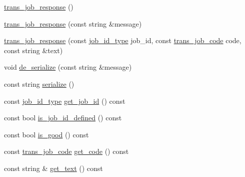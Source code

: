 \begin{DoxyCompactItemize}
\item 
\hyperlink{classuva_1_1smt_1_1bpbd_1_1common_1_1messaging_1_1trans__job__response_ae7a6931b79309d260023c64fd4b080da}{trans\+\_\+job\+\_\+response} ()
\item 
\hyperlink{classuva_1_1smt_1_1bpbd_1_1common_1_1messaging_1_1trans__job__response_af719aea73081b32e7a0c39a752292766}{trans\+\_\+job\+\_\+response} (const string \&message)
\item 
\hyperlink{classuva_1_1smt_1_1bpbd_1_1common_1_1messaging_1_1trans__job__response_ac2814ba7823aff2be1bfa3ca06be1c1c}{trans\+\_\+job\+\_\+response} (const \hyperlink{namespaceuva_1_1smt_1_1bpbd_1_1common_1_1messaging_af12d41e7490214ac057969e9d4af1436}{job\+\_\+id\+\_\+type} job\+\_\+id, const \hyperlink{classuva_1_1smt_1_1bpbd_1_1common_1_1messaging_1_1trans__job__code}{trans\+\_\+job\+\_\+code} code, const string \&text)
\item 
void \hyperlink{classuva_1_1smt_1_1bpbd_1_1common_1_1messaging_1_1trans__job__response_a622c08192b6fa4be571e21a5a2d07ae3}{de\+\_\+serialize} (const string \&message)
\item 
const string \hyperlink{classuva_1_1smt_1_1bpbd_1_1common_1_1messaging_1_1trans__job__response_af0bc18e3858e5b481c8c6eb6a5af9498}{serialize} ()
\item 
const \hyperlink{namespaceuva_1_1smt_1_1bpbd_1_1common_1_1messaging_af12d41e7490214ac057969e9d4af1436}{job\+\_\+id\+\_\+type} \hyperlink{classuva_1_1smt_1_1bpbd_1_1common_1_1messaging_1_1trans__job__response_a1c7615198ec21bf9eca3c881de1ef2bd}{get\+\_\+job\+\_\+id} () const 
\item 
const bool \hyperlink{classuva_1_1smt_1_1bpbd_1_1common_1_1messaging_1_1trans__job__response_ab2f1298855e8c9579d9688e81310cc39}{is\+\_\+job\+\_\+id\+\_\+defined} () const 
\item 
const bool \hyperlink{classuva_1_1smt_1_1bpbd_1_1common_1_1messaging_1_1trans__job__response_adb361ceab49050ec59f3505201f0c95f}{is\+\_\+good} () const 
\item 
const \hyperlink{classuva_1_1smt_1_1bpbd_1_1common_1_1messaging_1_1trans__job__code}{trans\+\_\+job\+\_\+code} \hyperlink{classuva_1_1smt_1_1bpbd_1_1common_1_1messaging_1_1trans__job__response_a1ab3c9cef7e2ec3f9ff004f5e4078297}{get\+\_\+code} () const 
\item 
const string \& \hyperlink{classuva_1_1smt_1_1bpbd_1_1common_1_1messaging_1_1trans__job__response_ab18aa6babd4d71d4c32ea852bc89742e}{get\+\_\+text} () const 
\end{DoxyCompactItemize}
